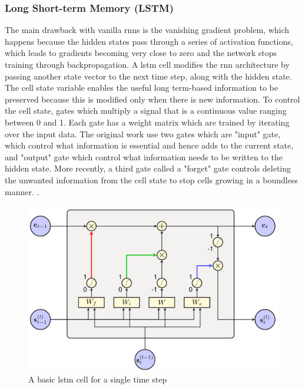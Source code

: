 \subsubsection{Long Short-term Memory (LSTM)}
The main drawback with vanilla \acrshort{rnn}s is the vanishing gradient problem, which happens because the hidden states pass through a series of  activation functions, which leads to gradients becoming very close to zero and the network stops training through backpropagation\cite{Hochreiter1997LongMemory}. A \acrfull{lstm} cell \cite{Hochreiter1997LongMemory} modifies the \acrshort{rnn} architecture by passing another state vector to the next time step, along with the hidden state. The cell state variable enables the useful long term-based information to be preserved because this is modified only when there is new information. To control the cell state, gates which multiply a signal that is a continuous value ranging between 0 and 1. Each gate has a weight matrix which are trained by iterating over the input data. The original work use two gates which are "input" gate, which control what information is essential and hence adds to the current state, and "output" gate which control what information needs to be written to the hidden state. More recently, a third gate called a "forget" gate controls deleting the unwanted information  from the cell state to stop cells growing in a boundless manner. \cite{Gers2000LearningLSTM}.

\begin{figure}[ht]
  \begin{center}
    \includegraphics[width=\textwidth]{images/lstm.png} 
    \caption{A basic \acrshort{lstm} cell for a single time step \cite{Enarvi2018ModelingRecognition}}
    \label{fig:lstm}
  \end{center}
\end{figure}

